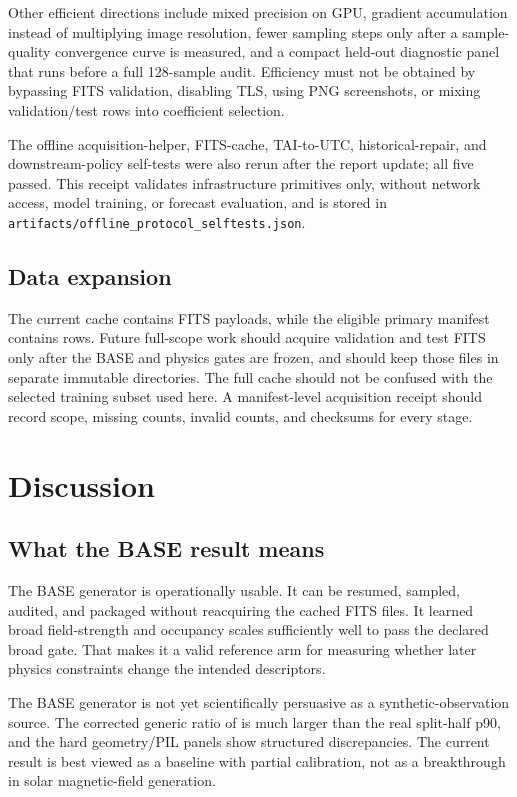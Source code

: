 \documentclass[11pt,oneside]{report}
\begin{document}
Other efficient directions include mixed precision on GPU, gradient accumulation instead of multiplying image resolution, fewer sampling steps only after a sample-quality convergence curve is measured, and a compact held-out diagnostic panel that runs before a full 128-sample audit. Efficiency must not be obtained by bypassing FITS validation, disabling TLS, using PNG screenshots, or mixing validation/test rows into coefficient selection.

The offline acquisition-helper, FITS-cache, TAI-to-UTC, historical-repair, and downstream-policy self-tests were also rerun after the report update; all five passed. This receipt validates infrastructure primitives only, without network access, model training, or forecast evaluation, and is stored in \texttt{artifacts/offline\_protocol\_selftests.json}.

\section{Data expansion}

The current cache contains \AcquiredCount{} FITS payloads, while the eligible primary manifest contains \PrimaryCount{} rows. Future full-scope work should acquire validation and test FITS only after the BASE and physics gates are frozen, and should keep those files in separate immutable directories. The full cache should not be confused with the selected training subset used here. A manifest-level acquisition receipt should record scope, missing counts, invalid counts, and checksums for every stage.

\chapter{Discussion}

\section{What the BASE result means}

The BASE generator is operationally usable. It can be resumed, sampled, audited, and packaged without reacquiring the cached FITS files. It learned broad field-strength and occupancy scales sufficiently well to pass the declared broad gate. That makes it a valid reference arm for measuring whether later physics constraints change the intended descriptors.

The BASE generator is not yet scientifically persuasive as a synthetic-observation source. The corrected generic ratio of \AuditDistanceRatio{} is much larger than the real split-half p90, and the hard geometry/PIL panels show structured discrepancies. The current result is best viewed as a baseline with partial calibration, not as a breakthrough in solar magnetic-field generation.
\end{document}
